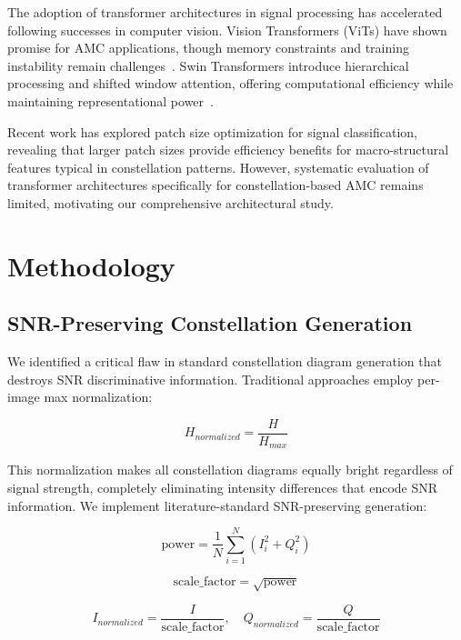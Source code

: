\documentclass{ELSP}
\begin{document}
The adoption of transformer architectures in signal processing has accelerated following successes in computer vision. Vision Transformers (ViTs) have shown promise for AMC applications, though memory constraints and training instability remain challenges~\cite{vit2020}. Swin Transformers introduce hierarchical processing and shifted window attention, offering computational efficiency while maintaining representational power~\cite{swin2021}.

Recent work has explored patch size optimization for signal classification, revealing that larger patch sizes provide efficiency benefits for macro-structural features typical in constellation patterns. However, systematic evaluation of transformer architectures specifically for constellation-based AMC remains limited, motivating our comprehensive architectural study.

\section{Methodology}

\subsection{SNR-Preserving Constellation Generation}

We identified a critical flaw in standard constellation diagram generation that destroys SNR discriminative information. Traditional approaches employ per-image max normalization:

\begin{equation}
H_{normalized} = \frac{H}{H_{max}}
\end{equation}

This normalization makes all constellation diagrams equally bright regardless of signal strength, completely eliminating intensity differences that encode SNR information. We implement literature-standard SNR-preserving generation:

\begin{equation}
\text{power} = \frac{1}{N} \sum_{i=1}^{N} (I_i^2 + Q_i^2)
\end{equation}

\begin{equation}
\text{scale\_factor} = \sqrt{\text{power}}
\end{equation}

\begin{equation}
I_{normalized} = \frac{I}{\text{scale\_factor}}, \quad Q_{normalized} = \frac{Q}{\text{scale\_factor}}
\end{equation}
\end{document}
